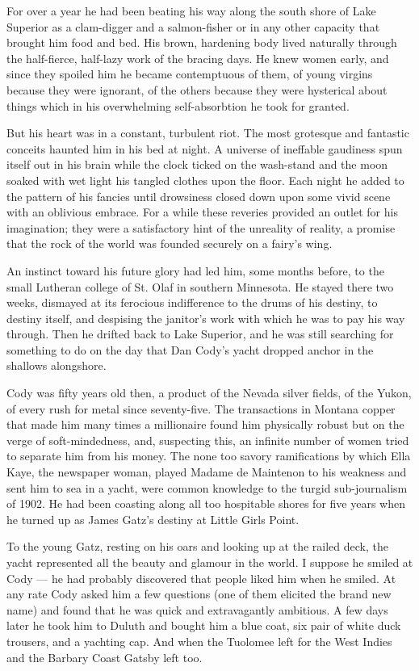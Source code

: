 \documentclass{znotebook}
\begin{document}
For over a year he had been beating his way along the south shore of Lake Superior as a clam-digger and a salmon-fisher or in any other capacity that brought him food and bed. His brown, hardening body lived naturally through the half-fierce, half-lazy work of the bracing days. He knew women early, and since they spoiled him he became contemptuous of them, of young virgins because they were ignorant, of the others because they were hysterical about things which in his overwhelming self-absorbtion he took for granted.

But his heart was in a constant, turbulent riot. The most grotesque and fantastic conceits haunted him in his bed at night. A universe of ineffable gaudiness spun itself out in his brain while the clock ticked on the wash-stand and the moon soaked with wet light his tangled clothes upon the floor. Each night he added to the pattern of his fancies until drowsiness closed down upon some vivid scene with an oblivious embrace. For a while these reveries provided an outlet for his imagination; they were a satisfactory hint of the unreality of reality, a promise that the rock of the world was founded securely on a fairy's wing.

An instinct toward his future glory had led him, some months before, to the small Lutheran college of St. Olaf in southern Minnesota. He stayed there two weeks, dismayed at its ferocious indifference to the drums of his destiny, to destiny itself, and despising the janitor's work with which he was to pay his way through. Then he drifted back to Lake Superior, and he was still searching for something to do on the day that Dan Cody's yacht dropped anchor in the shallows alongshore.

Cody was fifty years old then, a product of the Nevada silver fields, of the Yukon, of every rush for metal since seventy-five. The transactions in Montana copper that made him many times a millionaire found him physically robust but on the verge of soft-mindedness, and, suspecting this, an infinite number of women tried to separate him from his money. The none too savory ramifications by which Ella Kaye, the newspaper woman, played Madame de Maintenon to his weakness and sent him to sea in a yacht, were common knowledge to the turgid sub-journalism of 1902. He had been coasting along all too hospitable shores for five years when he turned up as James Gatz's destiny at Little Girls Point.

To the young Gatz, resting on his oars and looking up at the railed deck, the yacht represented all the beauty and glamour in the world. I suppose he smiled at Cody — he had probably discovered that people liked him when he smiled. At any rate Cody asked him a few questions (one of them elicited the brand new name) and found that he was quick and extravagantly ambitious. A few days later he took him to Duluth and bought him a blue coat, six pair of white duck trousers, and a yachting cap. And when the Tuolomee left for the West Indies and the Barbary Coast Gatsby left too.
\end{document}
